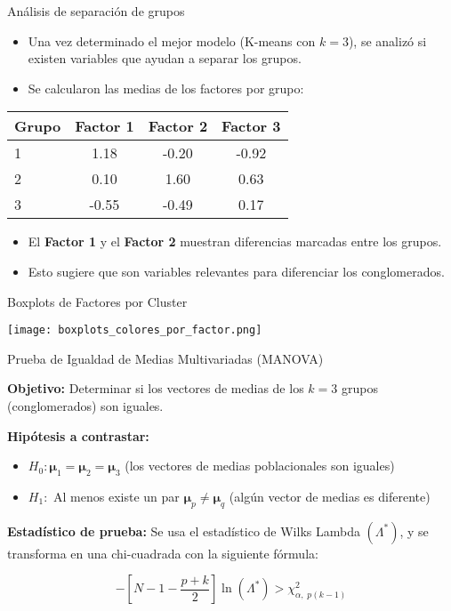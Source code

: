 \documentclass[
	11pt, %
]{beamer}
\begin{document}
\begin{frame}{Análisis de separación de grupos}
\begin{itemize}
    \item Una vez determinado el mejor modelo (K-means con $k=3$), se analizó si existen variables que ayudan a separar los grupos.
    \item Se calcularon las medias de los factores por grupo:
\end{itemize}
\begin{center}
\begin{tabular}{lccc}
\toprule
\textbf{Grupo} & \textbf{Factor 1} & \textbf{Factor 2} & \textbf{Factor 3} \\
\midrule
1 & 1.18 & -0.20 & -0.92 \\
2 & 0.10 &  1.60 &  0.63 \\
3 & -0.55 & -0.49 &  0.17 \\
\bottomrule
\end{tabular}
\end{center}
\vspace{0.3cm}
\begin{itemize}
    \item El \textbf{Factor 1} y el \textbf{Factor 2} muestran diferencias marcadas entre los grupos.
    \item Esto sugiere que son variables relevantes para diferenciar los conglomerados.
\end{itemize}
\end{frame}

\begin{frame}{Boxplots de Factores por Cluster}
\begin{center}
    \texttt{[image: boxplots\_colores\_por\_factor.png]}
\end{center}

\end{frame}


\begin{frame}{Prueba de Igualdad de Medias Multivariadas (MANOVA)}

\textbf{Objetivo:} Determinar si los vectores de medias de los $k = 3$ grupos (conglomerados) son iguales.

\vspace{0.3cm}
\textbf{Hipótesis a contrastar:}
\begin{itemize}
    \item $H_0: \bm{\mu}_1 = \bm{\mu}_2 = \bm{\mu}_3$ (los vectores de medias poblacionales son iguales)
    \item $H_1:$ Al menos existe un par $\bm{\mu}_p \neq \bm{\mu}_q$ (algún vector de medias es diferente)
\end{itemize}

\vspace{0.3cm}
\textbf{Estadístico de prueba:} Se usa el estadístico de Wilks Lambda $(\Lambda^*)$, y se transforma en una chi-cuadrada con la siguiente fórmula:

\[
- \left[N - 1 - \frac{p + k}{2} \right] \ln(\Lambda^*) > \chi^2_{\alpha, \; p(k - 1)}
\]

\end{frame}
\end{document}
